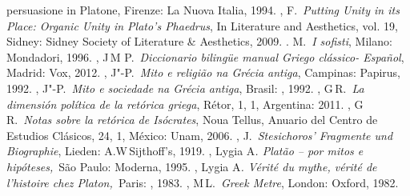 \begin{bibliohedra}
{  persuasione in Platone}, Firenze: La Nuova Italia, 1994.
, F.~\emph{Putting Unity in its Place: Organic Unity in
  Plato's Phaedrus}, In Literature and Aesthetics, vol. 19, Sidney:
  Sidney Society of Literature \& Aesthetics, 2009.
. M.~\emph{I sofisti}, Milano: Mondadori, 1996.
, J\,M P.~\emph{Diccionario bilingüe manual Griego clássico-
  Español}, Madrid: Vox, 2012.
, J"-P.~\emph{Mito e religião na Grécia antiga}, Campinas:
  Papirus, 1992.
, J"-P.~\emph{Mito e sociedade na Grécia antiga}, Brasil: ,
  1992.
, G\,R.~\emph{La dimensión política de la retórica griega},
  Rétor, 1, 1, Argentina: 2011.
, G\,R.~\emph{Notas sobre la retórica de Isócrates}, Noua Tellus,
  Anuario del Centro de Estudios Clásicos, 24, 1, México: Unam, 2006.
, J.~\emph{Stesichoros' Fragmente und Biographie}, Lieden:
  A.W\,Sijthoff's, 1919.
, Lygia A\emph{. Platão -- por mitos e hipóteses,}~São Paulo:
  Moderna, 1995.
, Lygia A\emph{. Vérité du mythe, vérité de l'histoire chez
  Platon,~}Paris: , 1983.
, M\,L.~\emph{Greek Metre}, London: Oxford, 1982.
\end{bibliohedra}
